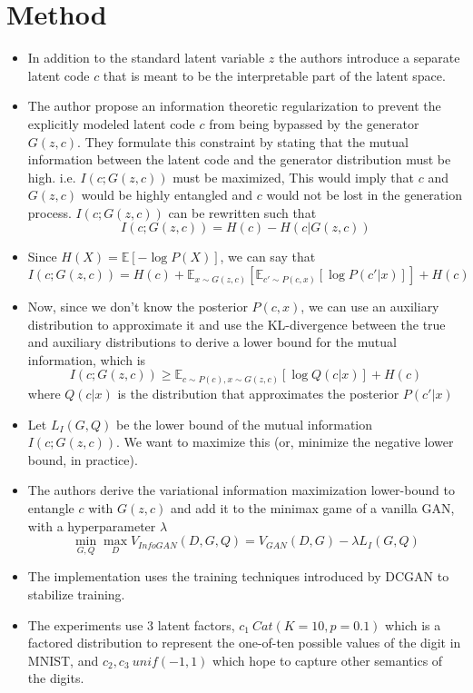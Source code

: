 \documentclass[12pt]{article}
\begin{document}
\section{Method}
  \begin{itemize}
    \item In addition to the standard latent variable $z$ the authors introduce a separate latent code $c$ that is meant to be the interpretable part of the latent space.
    \item The author propose an information theoretic regularization to prevent the explicitly modeled latent code $c$ from being bypassed by the generator $G(z,c)$. They formulate this constraint by stating that the mutual information between the latent code and the generator distribution must be high. i.e. $I(c; G(z,c))$ must be maximized, This would imply that $c$ and $G(z,c)$ would be highly entangled and $c$ would not be lost in the generation process. $I(c; G(z,c))$ can be rewritten such that $$I(c; G(z,c)) = H(c) - H(c|G(z,c))$$
    \item Since $H(X) = \mathbb{E}[-\log P(X)]$, we can say that $$I(c; G(z,c)) = H(c) + \mathbb{E}_{x \sim G(z,c)}[\mathbb{E}_{c' \sim P(c,x)}[\log P(c'|x)]] + H(c)$$
    \item Now, since we don't know the posterior $P(c,x)$, we can use an auxiliary distribution to approximate it and use the KL-divergence between the true and auxiliary distributions to derive a lower bound for the mutual information, which is $$I(c; G(z,c)) \geq \mathbb{E}_{c \sim P(c), x \sim G(z,c)}[\log Q(c|x)] + H(c)$$ where $Q(c|x)$ is the distribution that approximates the posterior $P(c'|x)$
    \item Let $L_I(G,Q)$ be the lower bound of the mutual information $I(c; G(z,c))$. We want to maximize this (or, minimize the negative lower bound, in practice).
    \item The authors derive the variational information maximization lower-bound to entangle $c$ with $G(z,c)$ and add it to the minimax game of a vanilla GAN, with a hyperparameter $\lambda$$$\min_{G,Q} \max_D V_{InfoGAN}(D,G,Q) = V_{GAN}(D,G) - \lambda L_I(G,Q)$$
    \item The implementation uses the training techniques introduced by DCGAN \cite{radford2015unsupervised} to stabilize training.
    \item The experiments use 3 latent factors, $c_1 ~ Cat(K=10,p=0.1)$ which is a factored distribution to represent the one-of-ten possible values of the digit in MNIST, and $c_2,c_3 ~ unif(-1,1)$ which hope to capture other semantics of the digits.
  \end{itemize}
\end{document}
